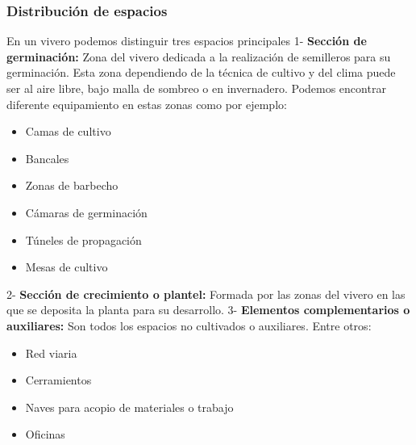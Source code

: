 \documentclass[a4paper,12pt,oneside]{article}
\begin{document}
\subsubsection{Distribución de espacios}
\label{sec:org461cd66}
En un vivero podemos distinguir tres espacios principales
1- \textbf{Sección de germinación:}
Zona del vivero dedicada a la realización de semilleros para su
germinación. Esta zona dependiendo de la técnica de cultivo y del clima puede
ser al aire libre, bajo malla de sombreo o en invernadero. 
Podemos encontrar diferente equipamiento en estas zonas como por ejemplo:\\
\begin{itemize}
\item Camas de cultivo
\item Bancales
\item Zonas de barbecho
\item Cámaras de germinación
\item Túneles de propagación
\item Mesas de cultivo\\
\end{itemize}

2- \textbf{Sección de crecimiento o plantel:}
Formada por las zonas del vivero en las que se deposita la planta para su
desarrollo.
3- \textbf{Elementos complementarios o auxiliares:}
Son todos los espacios no cultivados o auxiliares. Entre otros:\\
\begin{itemize}
\item Red viaria
\item Cerramientos
\item Naves para acopio de materiales o trabajo
\item Oficinas
\end{itemize}
\subsubsection{}
\label{sec:org5237ad5}
\end{document}
